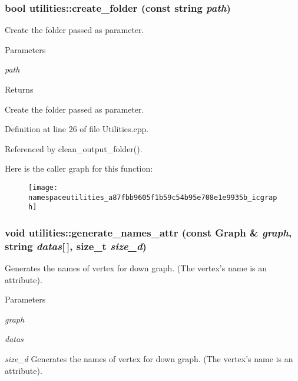 \hypertarget{namespaceutilities_a87fbb9605f1b59c54b95e708e1e9935b}{
\subsubsection[{create\_\-folder}]{\setlength{\rightskip}{0pt plus 5cm}bool utilities::create\_\-folder (const string {\em path})}}
\label{namespaceutilities_a87fbb9605f1b59c54b95e708e1e9935b}
Create the folder passed as parameter. 
\begin{DoxyParams}{Parameters}
\item[{\em path}]\end{DoxyParams}
\begin{DoxyReturn}{Returns}

\end{DoxyReturn}
Create the folder passed as parameter. 

Definition at line 26 of file Utilities.cpp.



Referenced by clean\_\-output\_\-folder().



Here is the caller graph for this function:\nopagebreak
\begin{figure}[H]
\begin{center}
\leavevmode
\texttt{[image: namespaceutilities\_a87fbb9605f1b59c54b95e708e1e9935b\_icgraph]}
\end{center}
\end{figure}


\hypertarget{namespaceutilities_ac88e50b1c88f16e0d052555d773b7be5}{
\subsubsection[{generate\_\-names\_\-attr}]{\setlength{\rightskip}{0pt plus 5cm}void utilities::generate\_\-names\_\-attr (const Graph \& {\em graph}, \/  string {\em datas}\mbox{[}$\,$\mbox{]}, \/  size\_\-t {\em size\_\-d})}}
\label{namespaceutilities_ac88e50b1c88f16e0d052555d773b7be5}
Generates the names of vertex for down graph. (The vertex's name is an attribute). 
\begin{DoxyParams}{Parameters}
\item[{\em graph}]\item[{\em datas}]\item[{\em size\_\-d}]Generates the names of vertex for down graph. (The vertex's name is an attribute). \end{DoxyParams}


